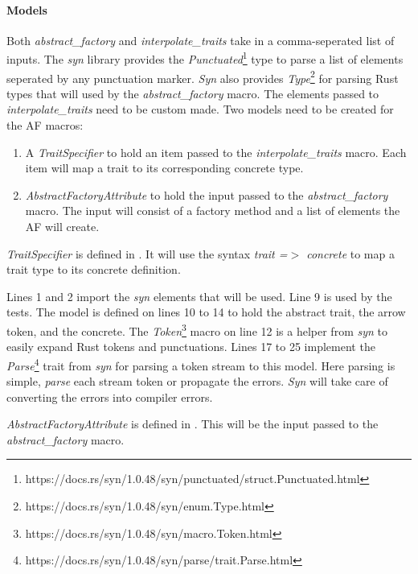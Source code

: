 \paragraph{Models}
Both \textit{abstract\_factory} and \textit{interpolate\_traits} take in a comma-seperated list of inputs.
The \textit{syn} library provides the \textit{Punctuated}\footnote{https://docs.rs/syn/1.0.48/syn/punctuated/struct.Punctuated.html} type to parse a list of elements seperated by any punctuation marker.
\textit{Syn} also provides \textit{Type}\footnote{https://docs.rs/syn/1.0.48/syn/enum.Type.html} for parsing Rust types that will used by the \textit{abstract\_factory} macro.
The elements passed to \textit{interpolate\_traits} need to be custom made.
Two models need to be created for the AF macros:

\begin{enumerate}
	\item A \textit{TraitSpecifier} to hold an item passed to the \textit{interpolate\_traits} macro.
	      Each item will map a trait to its corresponding concrete type.
	\item \textit{AbstractFactoryAttribute} to hold the input passed to the \textit{abstract\_factory} macro.
	      The input will consist of a factory method and a list of elements the AF will create.
\end{enumerate}

\textit{TraitSpecifier} is defined in .
It will use the syntax \textit{trait =$>$ concrete} to map a trait type to its concrete definition.


Lines 1 and 2 import the \textit{syn} elements that will be used.
Line 9 is used by the tests.
The model is defined on lines 10 to 14 to hold the abstract trait, the arrow token, and the concrete.
The \textit{Token}\footnote{https://docs.rs/syn/1.0.48/syn/macro.Token.html} macro on line 12 is a helper from \textit{syn} to easily expand Rust tokens and punctuations.
Lines 17 to 25 implement the \textit{Parse}\footnote{https://docs.rs/syn/1.0.48/syn/parse/trait.Parse.html} trait from \textit{syn} for parsing a token stream to this model.
Here parsing is simple, \textit{parse} each stream token or propagate the errors.
\textit{Syn} will take care of converting the errors into compiler errors.

\textit{AbstractFactoryAttribute} is defined in .
This will be the input passed to the \textit{abstract\_factory} macro.

